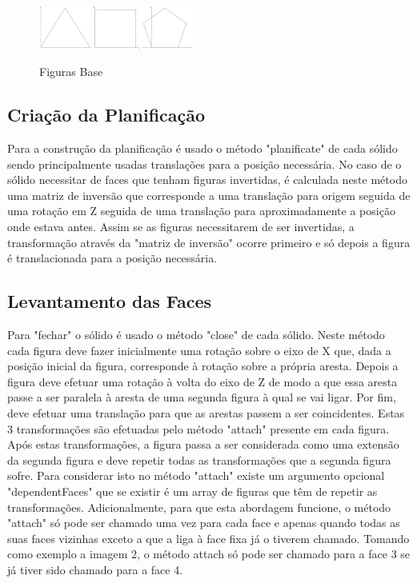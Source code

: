 \documentclass{report}
\begin{document}
\begin{figure}[H]
   \centering
   \includegraphics[width=2in]{Figures.PNG}
   \label{fig:figuras}
   \caption{Figuras Base}
\end{figure}

\subsection{Criação da Planificação}

\quad Para a construção da planificação é usado o método "planificate" de cada sólido sendo principalmente usadas translações para a posição necessária. No caso de o sólido necessitar de faces que tenham figuras invertidas, é calculada neste método uma matriz de inversão que corresponde a uma translação para origem seguida de uma rotação em Z seguida de uma translação para aproximadamente a posição onde estava antes. Assim se as figuras necessitarem de ser invertidas, a transformação através da "matriz de inversão" ocorre primeiro e só depois a figura é translacionada para a posição necessária.

\subsection{Levantamento das Faces}

\quad Para "fechar" o sólido é usado o método "close" de cada sólido. Neste método cada figura deve fazer inicialmente uma rotação sobre o eixo de X que, dada a posição inicial da figura, corresponde à rotação sobre a própria aresta. Depois a figura deve efetuar uma rotação à volta do eixo de Z de modo a que essa aresta passe a ser paralela à aresta de uma segunda figura à qual se vai ligar. Por fim, deve efetuar uma translação para que as arestas passem a ser coincidentes. Estas 3 transformações são efetuadas pelo método "attach" presente em cada figura. Após estas transformações, a figura passa a ser considerada como uma extensão da segunda figura e deve repetir todas as transformações que a segunda figura sofre. Para considerar isto no método "attach" existe um argumento opcional "dependentFaces" que se existir é um array de figuras que têm de repetir as transformações. Adicionalmente, para que esta abordagem funcione, o método "attach" só pode ser chamado uma vez para cada face e apenas quando todas as suas faces vizinhas exceto a que a liga à face fixa já o tiverem chamado. Tomando como exemplo a imagem 2, o método attach só pode ser chamado para a face 3 se já tiver sido chamado para a face 4.
\end{document}
